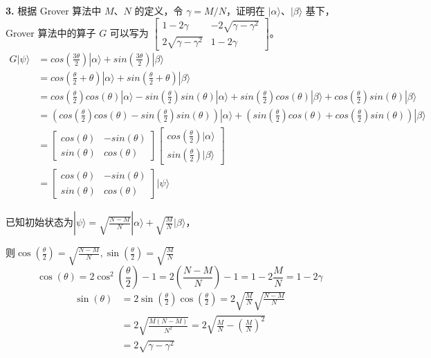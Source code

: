 \documentclass[11pt]{article}
\begin{document}
{\bf 3.} 根据 Grover 算法中 $M$、$N$ 的定义，令 $\gamma = M/N$，证明在 $|\alpha\rangle$、$|\beta\rangle$ 基下，Grover 算法中的算子 $G$ 可以写为 $\begin{bmatrix}
    1-2\gamma & -2\sqrt{\gamma-\gamma^2} \\ 2\sqrt{\gamma-\gamma^2} & 1-2\gamma
\end{bmatrix}$。
\[
\begin{aligned}
G|\psi\rangle &= cos(\frac{3\theta}{2})|\alpha\rangle + sin(\frac{3\theta}{2})|\beta\rangle \\
&= cos(\frac{\theta}{2} + \theta)|\alpha\rangle + sin(\frac{\theta}{2} + \theta)|\beta\rangle \\
&= cos(\frac{\theta}{2})cos(\theta)|\alpha\rangle - sin(\frac{\theta}{2})sin(\theta)|\alpha\rangle + sin(\frac{\theta}{2})cos(\theta)|\beta\rangle + cos(\frac{\theta}{2})sin(\theta)|\beta\rangle \\
&= (cos(\frac{\theta}{2})cos(\theta) - sin(\frac{\theta}{2})sin(\theta))|\alpha\rangle + (sin(\frac{\theta}{2})cos(\theta) + cos(\frac{\theta}{2})sin(\theta))|\beta\rangle \\
&= \begin{bmatrix}
    cos(\theta) & -sin(\theta) \\
    sin(\theta) & cos(\theta)
\end{bmatrix}
\begin{bmatrix}
    cos(\frac{\theta}{2}) |\alpha\rangle \\
    sin(\frac{\theta}{2}) |\beta\rangle
\end{bmatrix}\\
&= \begin{bmatrix}
    cos(\theta) & -sin(\theta) \\
    sin(\theta) & cos(\theta)
\end{bmatrix}
|\psi\rangle
\end{aligned}
\]

已知初始状态为$|\psi\rangle = \sqrt{\frac{N-M}{N}}|\alpha\rangle + \sqrt{\frac{M}{N}}|\beta\rangle$，

则$\cos(\frac{\theta}{2}) = \sqrt{\frac{N-M}{N}}, \sin(\frac{\theta}{2}) = \sqrt{\frac{M}{N}}$
\[
\cos(\theta) = 2\cos^2(\frac{\theta}{2}) - 1 = 2(\frac{N-M}{N}) - 1 = 1 - 2\frac{M}{N} = 1 - 2\gamma
\]
\[
\begin{aligned}
\sin(\theta) &= 2\sin(\frac{\theta}{2})\cos(\frac{\theta}{2}) = 2\sqrt{\frac{M}{N}}\sqrt{\frac{N-M}{N}} \\
&= 2\sqrt{\frac{M(N-M)}{N^2}} = 2\sqrt{\frac{M}{N} - (\frac{M}{N})^2} \\
&= 2\sqrt{\gamma - \gamma^2}
\end{aligned}
\]
\end{document}
